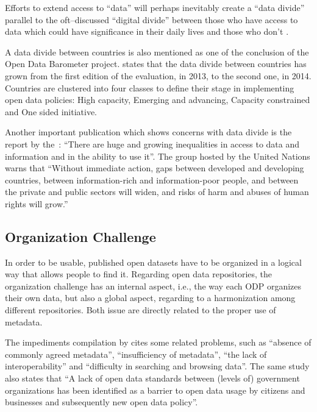 \begin{citacao}
Efforts to extend access to “data” will perhaps inevitably create a “data divide” parallel to the oft–discussed “digital divide” between those who have access to data which could have significance in their daily lives and those who don’t \cite[p.2]{Gurstein2011}.
\end{citacao}

A data divide between countries is also mentioned as one of the conclusion of the Open Data Barometer project.
 states that the data divide between countries has grown from the first edition of the evaluation, in 2013, to the second one, in 2014.
Countries are clustered into four classes to define their stage in implementing open data policies: High capacity, Emerging and advancing, Capacity constrained and One sided initiative.

Another important publication which shows concerns with data divide is the report by the~: ``There are huge and growing inequalities in access to data and information and in the ability to use it''.
The group hosted by the United Nations warns that ``Without immediate action, gaps between developed and developing countries, between information-rich and information-poor people, and between the private and public sectors will widen, and risks of harm and abuses of human rights will grow.''

\subsection{Organization Challenge}
\label{sec:org_problem}

In order to be usable, published open datasets have to be organized in a logical way that allows people to find it.
Regarding open data repositories, the organization challenge has an internal aspect, i.e., the way each ODP organizes their own data, but also a global aspect, regarding to a harmonization among different repositories.
Both issue are directly related to the proper use of metadata.

The impediments compilation by  cites some related problems, such 
as ``absence of commonly agreed metadata'', ``insufficiency of metadata'', ``the lack of interoperability'' and ``difficulty in searching and browsing data''.
The same study also states that ``A lack of open data standards between (levels of) government organizations has been identified as a barrier to open data usage by citizens and businesses and subsequently new open data policy''.

